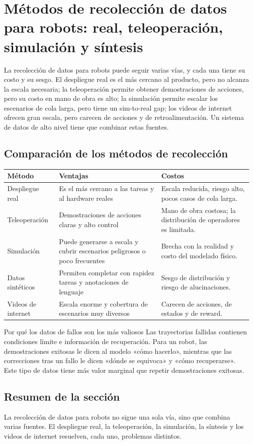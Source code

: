 \section{Métodos de recolección de datos para robots: real, teleoperación, simulación y síntesis}

La recolección de datos para robots puede seguir varias vías, y cada una tiene su costo y su sesgo. El despliegue real es el más cercano al producto, pero no alcanza la escala necesaria; la teleoperación permite obtener demostraciones de acciones, pero su costo en mano de obra es alto; la simulación permite escalar los escenarios de cola larga, pero tiene un sim-to-real gap; los videos de internet ofrecen gran escala, pero carecen de acciones y de retroalimentación. Un sistema de datos de alto nivel tiene que combinar estas fuentes.

\subsection{Comparación de los métodos de recolección}

\noindent\begin{longtable}{p{}p{}p{}}
\toprule
Método & Ventajas & Costos \\
\midrule
Despliegue real & Es el más cercano a las tareas y al hardware reales & Escala reducida, riesgo alto, pocos casos de cola larga. \\
Teleoperación & Demostraciones de acciones claras y alto control & Mano de obra costosa; la distribución de operadores es limitada. \\
Simulación & Puede generarse a escala y cubrir escenarios peligrosos o poco frecuentes & Brecha con la realidad y costo del modelado físico. \\
Datos sintéticos & Permiten completar con rapidez tareas y anotaciones de lenguaje & Sesgo de distribución y riesgo de alucinaciones. \\
Videos de internet & Escala enorme y cobertura de escenarios muy diversos & Carecen de acciones, de estados y de reward. \\
\bottomrule
\end{longtable}

\begin{knowledgebox}{Por qué los datos de fallos son los más valiosos}
Las trayectorias fallidas contienen condiciones límite e información de recuperación. Para un robot, las demostraciones exitosas le dicen al modelo «cómo hacerlo», mientras que las correcciones tras un fallo le dicen «dónde se equivoca» y «cómo recuperarse». Este tipo de datos tiene más valor marginal que repetir demostraciones exitosas.
\end{knowledgebox}

\subsection{Resumen de la sección}

La recolección de datos para robots no sigue una sola vía, sino que combina varias fuentes. El despliegue real, la teleoperación, la simulación, la síntesis y los videos de internet resuelven, cada uno, problemas distintos.
